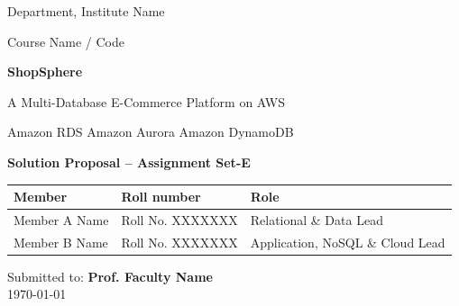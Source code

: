 \documentclass[11pt,a4paper]{article}
\newcommand{\memberA}{Member A Name}
\newcommand{\rollA}{Roll No. XXXXXXX}
\newcommand{\memberB}{Member B Name}
\newcommand{\rollB}{Roll No. XXXXXXX}
\newcommand{\course}{Course Name / Code}
\newcommand{\faculty}{Prof. Faculty Name}
\newcommand{\institute}{Department, Institute Name}
\begin{document}
\begin{titlepage}
\centering
\vspace*{1.5cm}
{\color{muted}\large \institute\par}
\vspace{0.4cm}
{\color{muted}\course\par}
\vspace{2cm}
{\Huge\bfseries\color{primary} ShopSphere\par}
\vspace{0.3cm}
{\Large A Multi-Database E-Commerce Platform on AWS\par}
\vspace{0.3cm}
{\large\color{muted} Amazon RDS \textbullet{} Amazon Aurora \textbullet{} Amazon DynamoDB\par}
\vspace{1.2cm}
{\large\bfseries Solution Proposal -- Assignment Set-E\par}
\vspace{2cm}
\begin{tabular}{@{}lll@{}}
\toprule
\textbf{Member} & \textbf{Roll number} & \textbf{Role}\\
\midrule
\memberA & \rollA & Relational \& Data Lead\\
\memberB & \rollB & Application, NoSQL \& Cloud Lead\\
\bottomrule
\end{tabular}

\vfill
Submitted to: \textbf{\faculty}\\[4pt]
\today
\end{titlepage}

\begin{abstract}
\noindent We propose \textbf{ShopSphere}, a working online shop deployed on Amazon Web Services in which customers register and log in, browse products, manage a cart, place orders, pay and track deliveries. Rather than forcing all data into one database, ShopSphere places each kind of data in the AWS database whose model matches its access pattern: \textbf{Amazon RDS for PostgreSQL} stores customers, products, orders and payments with full ACID guarantees; \textbf{Amazon Aurora PostgreSQL} hosts the same relational schema during a simulated festival sale, separating write traffic (orders) from read traffic (browsing) across instances in different Availability Zones; and \textbf{Amazon DynamoDB} keeps shopping carts, login sessions and user preferences as key-value documents. A runtime switch moves the application from RDS to Aurora without redeployment, and every screen displays which database and which instance served it, so each architectural claim can be verified live in the AWS Management Console. The design targets near-zero cost (a few dollars of AWS Free Tier credits) and is planned for a two-member team with clearly separated ownership.
\end{abstract}
\end{document}
